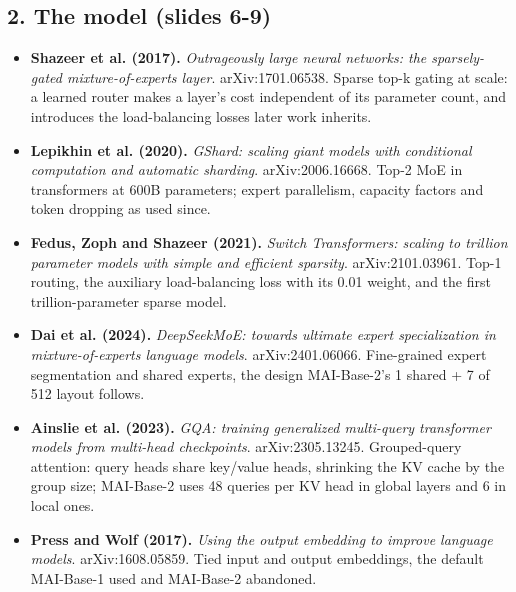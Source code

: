 \documentclass[11pt,letterpaper]{article}
\begin{document}
\subsection*{2. The model (slides 6-9)}
\begin{itemize}[leftmargin=1.2em,itemsep=3pt]\sloppy
\item \textbf{Shazeer et al. (2017).} \textit{Outrageously large neural networks: the sparsely-gated mixture-of-experts layer}. arXiv:1701.06538. Sparse top-k gating at scale: a learned router makes a layer's cost independent of its parameter count, and introduces the load-balancing losses later work inherits.
\item \textbf{Lepikhin et al. (2020).} \textit{GShard: scaling giant models with conditional computation and automatic sharding}. arXiv:2006.16668. Top-2 MoE in transformers at 600B parameters; expert parallelism, capacity factors and token dropping as used since.
\item \textbf{Fedus, Zoph and Shazeer (2021).} \textit{Switch Transformers: scaling to trillion parameter models with simple and efficient sparsity}. arXiv:2101.03961. Top-1 routing, the auxiliary load-balancing loss with its 0.01 weight, and the first trillion-parameter sparse model.
\item \textbf{Dai et al. (2024).} \textit{DeepSeekMoE: towards ultimate expert specialization in mixture-of-experts language models}. arXiv:2401.06066. Fine-grained expert segmentation and shared experts, the design MAI-Base-2's 1 shared + 7 of 512 layout follows.
\item \textbf{Ainslie et al. (2023).} \textit{GQA: training generalized multi-query transformer models from multi-head checkpoints}. arXiv:2305.13245. Grouped-query attention: query heads share key/value heads, shrinking the KV cache by the group size; MAI-Base-2 uses 48 queries per KV head in global layers and 6 in local ones.
\item \textbf{Press and Wolf (2017).} \textit{Using the output embedding to improve language models}. arXiv:1608.05859. Tied input and output embeddings, the default MAI-Base-1 used and MAI-Base-2 abandoned.
\end{itemize}
\end{document}
